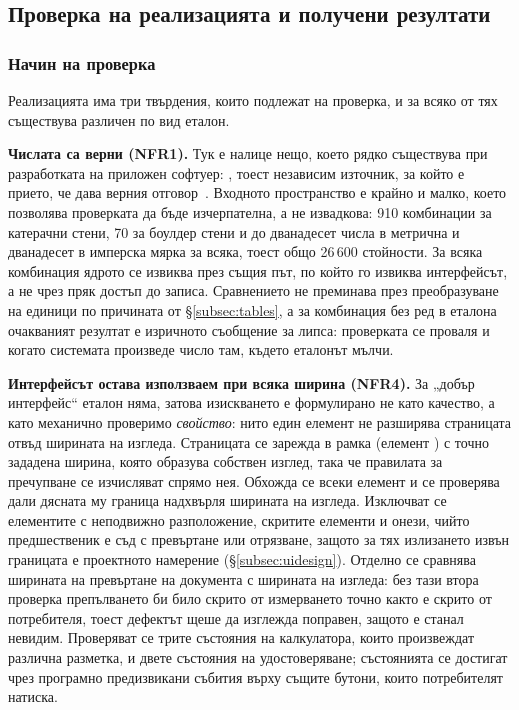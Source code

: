 \subsection{Проверка на реализацията и получени резултати}
\label{subsec:method}

\subsubsection{Начин на проверка}
\label{subsec:howcheck}

Реализацията има три твърдения, които подлежат на проверка, и за всяко от тях
съществува различен по вид еталон.

\textbf{Числата са верни (NFR1).} Тук е налице нещо, което рядко съществува при
разработката на приложен софтуер: , тоест независим източник, за който е
прието, че дава верния отговор~\cite{barr2015oracle}. Входното пространство е крайно и
малко, което позволява проверката да бъде изчерпателна, а не извадкова: 910 комбинации
за катерачни стени, 70 за боулдер стени и до дванадесет числа в метрична и дванадесет в
имперска мярка за всяка, тоест общо 26\,600 стойности. За всяка комбинация ядрото се
извиква през същия път, по който го извиква интерфейсът, а не чрез пряк достъп до
записа. Сравнението не преминава през преобразуване на единици по причината от
§\ref{subsec:tables}, а за комбинация без ред в еталона очакваният резултат е изричното
съобщение за липса: проверката се проваля и когато системата произведе число там,
където еталонът мълчи.

\textbf{Интерфейсът остава използваем при всяка ширина (NFR4).} За „добър интерфейс“
еталон няма, затова изискването е формулирано не като качество, а като механично
проверимо \emph{свойство}: нито един елемент не разширява страницата отвъд ширината на
изгледа. Страницата се зарежда в рамка (елемент ) с точно зададена ширина,
която образува собствен изглед, така че правилата за пречупване се изчисляват спрямо
нея. Обхожда се всеки елемент и се проверява дали дясната му граница надхвърля ширината
на изгледа. Изключват се елементите с неподвижно разположение, скритите елементи и
онези, чийто предшественик е съд с превъртане или отрязване, защото за тях излизането
извън границата е проектното намерение (§\ref{subsec:uidesign}). Отделно се сравнява
ширината на превъртане на документа с ширината на изгледа: без тази втора проверка
препълването би било скрито от измерването точно както е скрито от потребителя, тоест
дефектът щеше да изглежда поправен, защото е станал невидим. Проверяват се трите
състояния на калкулатора, които произвеждат различна разметка, и двете състояния на
удостоверяване; състоянията се достигат чрез програмно предизвикани събития върху
същите бутони, които потребителят натиска.

